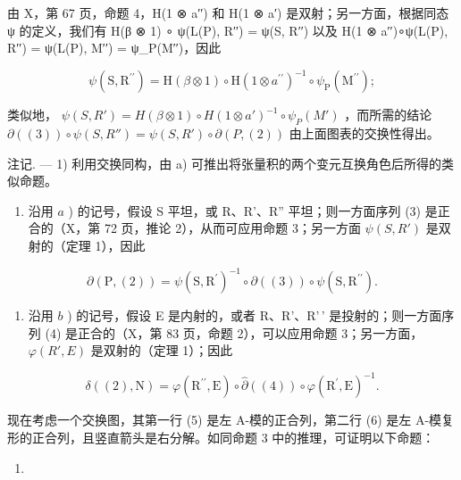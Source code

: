 由 X，第 67 页，命题 4，H(1 ⊗ a′′) 和 H(1 ⊗ a′) 是双射；另一方面，根据同态 ψ 的定义，我们有 H(β ⊗ 1) ∘ ψ(L(P), R′′) = ψ(S, R′′) 以及 H(1 ⊗ a′′)∘ψ(L(P), R′′) = ψ(L(P), M′′) = ψ\_P(M′′)，因此

\[
\psi (\mathrm{S}, \mathrm{R} ^ {\prime \prime}) = \mathrm{H} (\beta \otimes 1) \circ \mathrm{H} (1 \otimes a ^ {\prime \prime}) ^ {- 1} \circ \psi_ {\mathrm{P}} (\mathrm{M} ^ {\prime \prime});
\]

类似地， \(\psi(S, R') = H(\beta \otimes 1) \circ H(1 \otimes a')^{-1} \circ \psi_P(M')\) ，而所需的结论 \(\partial((3)) \circ \psi(S, R'') = \psi(S, R') \circ \partial(P, (2))\) 由上面图表的交换性得出。

注记. --- 1) 利用交换同构，由 a) 可推出将张量积的两个变元互换角色后所得的类似命题。

\begin{enumerate}
\def\labelenumi{\arabic{enumi})}
\setcounter{enumi}{1}
\tightlist
\item
  沿用 \(a\) ) 的记号，假设 S 平坦，或 R、R'、R'' 平坦；则一方面序列 (3) 是正合的（X，第 72 页，推论 2），从而可应用命题 3；另一方面 \(\psi(S, R')\) 是双射的（定理 1），因此
\end{enumerate}

\[
\partial (\mathrm{P}, (2)) = \psi (\mathrm{S}, \mathrm{R} ^ {\prime}) ^ {- 1} \circ \partial ((3)) \circ \psi (\mathrm{S}, \mathrm{R} ^ {\prime \prime}).
\]

\begin{enumerate}
\def\labelenumi{\arabic{enumi})}
\setcounter{enumi}{2}
\tightlist
\item
  沿用 \(b\) ) 的记号，假设 E 是内射的，或者 R、R'、R'\,' 是投射的；则一方面序列 (4) 是正合的（X，第 83 页，命题 2），可以应用命题 3；另一方面， \(\varphi(R', E)\) 是双射的（定理 1）；因此
\end{enumerate}

\[
\delta ((2), \mathrm{N}) = \varphi (\mathrm{R} ^ {\prime \prime}, \mathrm{E}) \circ \hat {\partial} ((4)) \circ \varphi (\mathrm{R} ^ {\prime}, \mathrm{E}) ^ {- 1}.
\]

现在考虑一个交换图，其第一行 (5) 是左 A-模的正合列，第二行 (6) 是左 A-模复形的正合列，且竖直箭头是右分解。如同命题 3 中的推理，可证明以下命题：

\begin{enumerate}
\def\labelenumi{(\arabic{enumi})}
\setcounter{enumi}{4}
\tightlist
\item
\end{enumerate}

